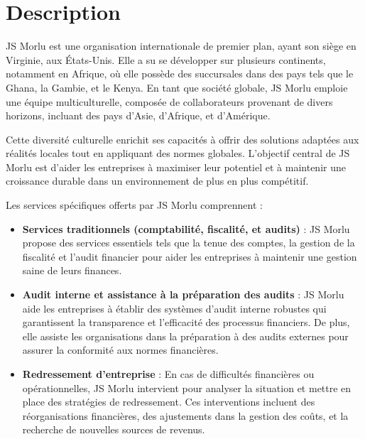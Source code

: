 {\fontsize{12pt}{13pt}\selectfont
\section{Description}

JS Morlu est une organisation internationale de premier plan, ayant son siège en Virginie, aux États-Unis. Elle a su se développer sur plusieurs continents, notamment en Afrique, où elle possède des succursales dans des pays tels que le Ghana, la Gambie, et le Kenya. En tant que société globale, JS Morlu emploie une équipe multiculturelle, composée de collaborateurs provenant de divers horizons, incluant des pays d'Asie, d'Afrique, et d'Amérique. 

\vspace{0.5cm}

Cette diversité culturelle enrichit ses capacités à offrir des solutions adaptées aux réalités locales tout en appliquant des normes globales. L'objectif central de JS Morlu est d'aider les entreprises à maximiser leur potentiel et à maintenir une croissance durable dans un environnement de plus en plus compétitif.

\vspace{0.5cm}

Les services spécifiques offerts par JS Morlu comprennent :

\vspace{0.3cm}

\begin{itemize}
    \item \textbf{Services traditionnels (comptabilité, fiscalité, et audits)} :
JS Morlu propose des services essentiels tels que la tenue des comptes, la gestion de la fiscalité et l’audit financier pour aider les entreprises à maintenir une gestion saine de leurs finances.

\vspace{0.3cm}

\item \textbf{Audit interne et assistance à la préparation des audits} :
JS Morlu aide les entreprises à établir des systèmes d’audit interne robustes qui garantissent la transparence et l'efficacité des processus financiers. De plus, elle assiste les organisations dans la préparation à des audits externes pour assurer la conformité aux normes financières.

\vspace{0.3cm}

\item \textbf{Redressement d'entreprise} :
En cas de difficultés financières ou opérationnelles, JS Morlu intervient pour analyser la situation et mettre en place des stratégies de redressement. Ces interventions incluent des réorganisations financières, des ajustements dans la gestion des coûts, et la recherche de nouvelles sources de revenus.


\end{itemize}}

